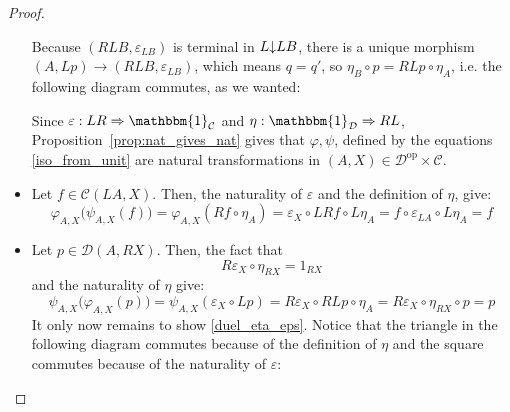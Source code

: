 \begin{proof}
\begin{itemize}
\begin{center}
\end{center}
Because $(RLB,\varepsilon_{LB})$ is terminal in $L\mkern-5mu\downarrow\mkern-5mu LB$, there is a unique morphism $(A,Lp)\to(RLB,\varepsilon_{LB})$, which means $q=q'$, so $\eta_B\circ p=RLp\circ\eta_A$, i.e. the following diagram commutes, as we wanted:
\begin{center}
\end{center}
Since $\varepsilon:LR\Rightarrow\mathbbm{1}_{\mathcal{C}}$ and $\eta:\mathbbm{1}_{\mathcal{D}}\Rightarrow RL$, Proposition~\ref{prop:nat_gives_nat} gives that $\varphi,\psi$, defined by the equations \eqref{iso_from_unit} are natural transformations in $(A,X)\in\mathcal{D}^{\mathrm{op}}\times\mathcal{C}$.
\item Let $f\in\mathcal{C}(LA,X)$. Then, the naturality of $\varepsilon$ and the definition of $\eta$, give:
\[\varphi_{A,X}\big(\psi_{A,X}(f)\big)=\varphi_{A,X}(Rf\circ\eta_A)=\varepsilon_X\circ LRf\circ L\eta_A=f\circ\varepsilon_{LA}\circ L\eta_A=f\]
\item Let $p\in\mathcal{D}(A,RX)$. Then, the fact that
\begin{equation}\label{duel_eta_eps}
R\varepsilon_X\circ\eta_{RX}=1_{RX}
\end{equation}
and the naturality of $\eta$ give:
\[\psi_{A,X}\big(\varphi_{A,X}(p)\big)=\psi_{A,X}(\varepsilon_X\circ Lp)=R\varepsilon_X\circ RLp\circ\eta_A=R\varepsilon_X\circ\eta_{RX}\circ p=p\]
It only now remains to show \eqref{duel_eta_eps}. Notice that the triangle in the following diagram commutes because of the definition of $\eta$ and the square commutes because of the naturality of $\varepsilon$:
\begin{center}
\end{center}

\end{itemize}
\end{proof}
